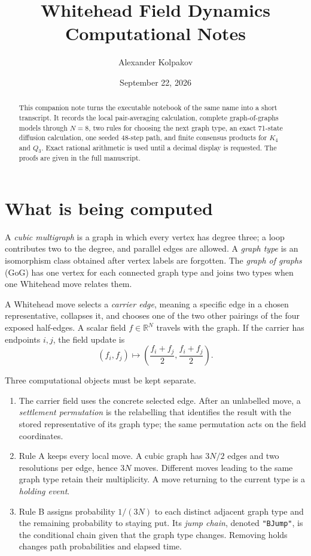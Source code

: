 \documentclass[11pt]{article}
\title{Whitehead Field Dynamics\\
  \large Computational Notes}
\author{Alexander Kolpakov}
\date{September 22, 2026}
\begin{document}
\maketitle

\begin{abstract}
This companion note turns the executable notebook of the same name into a
short transcript.  It records the local pair-averaging calculation, complete graph-of-graphs
models through $N=8$, two rules for choosing the next graph type, an exact
71-state diffusion calculation, one seeded 48-step path, and finite consensus
products for $K_4$ and $Q_3$.  Exact rational arithmetic is used until a
decimal display is requested. The proofs are given in the full manuscript.
\end{abstract}

\section{What is being computed}

A \emph{cubic multigraph} is a graph in which every vertex has degree three;
a loop contributes two to the degree, and parallel edges are allowed.  A
\emph{graph type} is an isomorphism class obtained after vertex labels are
forgotten.  The \emph{graph of graphs} (GoG) has one vertex for each connected
graph type and joins two types when one Whitehead move relates them.

A Whitehead move selects a \emph{carrier edge}, meaning a specific edge in a
chosen representative, collapses it, and chooses one of the two other pairings
of the four exposed half-edges.  A scalar field $f\in\mathbb R^N$ travels with
the graph.  If the carrier has endpoints $i,j$, the field update is
\[
  (f_i,f_j)\longmapsto
  \left(\frac{f_i+f_j}{2},\frac{f_i+f_j}{2}\right).
\]

Three computational objects must be kept separate.

\begin{enumerate}
  \item The carrier field uses the concrete selected edge.  After an
  unlabelled move, a \emph{settlement permutation} is the relabelling that
  identifies the result with the stored representative of its graph type; the
  same permutation acts on the field coordinates.
  \item Rule A keeps every local move. A cubic graph has
  $3N/2$ edges and two resolutions per edge, hence $3N$ moves.  Different
  moves leading to the same graph type retain their multiplicity.  A move
  returning to the current type is a \emph{holding event}.
  \item Rule B assigns probability $1/(3N)$ to each distinct adjacent
  graph type and the remaining probability to staying put. Its
  \emph{jump chain}, denoted \texttt{"BJump"}, is the conditional chain given
  that the graph type changes.  Removing holds changes path probabilities and
  elapsed time.
\end{enumerate}
\end{document}
